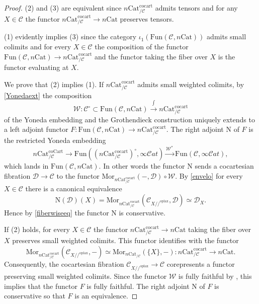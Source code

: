 \documentclass[10pt,oneside]{article}
\numberwithin{equation}{section} %
\numberwithin{figure}{section} %
\theoremstyle{plain}
\theoremstyle{definition}
\newcommand{\mC}{{\mathcal C}}
\newcommand{\mD}{{\mathcal D}}
\newcommand{\mW}{{\mathcal W}}
\newcommand{\N}{{\mathrm N}}
\newcommand{\Cat}{\mathrm{Cat}}
\newcommand{\Fun}{\mathrm{Fun}}
\newcommand{\cocart}{{\mathrm{cocart}}}
\newcommand{\oplax}{{\mathrm{oplax}}}
\newcommand{\Mor}{{\mathrm{Mor}}}
\newcommand{\coCart}{{\mathrm{coCart}}}
\newcommand{\scat}{\mathcal{C}\mathit{at}}
\begin{document}
\begin{proof}

(2) and (3) are equivalent since $n\Cat^\cocart_{/\mC}$ admits tensors and for any $X \in \mC$ the functor $ n\Cat^\cocart_{/\mC}\to n\Cat$ preserves tensors.

(1) evidently implies (3) since the category
$\iota_1(\Fun(\mC, n\Cat))$ admits small colimits and for every $X \in \mC$ the composition
of the functor $ \Fun(\mC, n\Cat) \to n\Cat^\cocart_{/\mC}$
and the functor taking the fiber over $X$ is the functor evaluating at $X.$

We prove that (2) implies (1).
If $ n\Cat^\cocart_{/\mC}$ admits small weighted colimits, by \cref{Yonedaext} the composition 
$$ \mW: \mC^\circ \subset \Fun(\mC, n\Cat) \xrightarrow{\int} n\Cat^\cocart_{/\mC} $$
of the Yoneda embedding and the Grothendieck construction
uniquely extends to a left adjoint functor 
$F: \Fun(\mC, n\Cat) \to n\Cat^\cocart_{/\mC}.$
The right adjoint $\N$ of $F$ is the restricted Yoneda embedding
$$n\Cat ^\coCart_{/\mC} \to \Fun((n\Cat^\cocart_{/\mC})^\circ, \infty\scat) \xrightarrow{\mW^*} \Fun(\mC, \infty\scat), $$
which lands in $ \Fun(\mC, n\Cat).$
In other words the functor $\N$ sends a cocartesian fibration $\mD \to \mC $ to the functor $ \Mor_{n\Cat^\cocart_{/\mC}}(-,\mD) \circ \mW $. By \cref{envelo} for every $X \in \mC$ there is a canonical equivalence
$$\N(\mD)(X)= \Mor_{n\Cat^\cocart_{/\mC}}(\mC_{X//^\oplax},\mD) \simeq \mD_{X}. $$
Hence by \cref{fiberwiseeq} the functor $\N$ is conservative.

If (2) holds, for every $X \in \mC$ the functor
$n\Cat^\cocart_{/\mC} \to n\Cat$ taking the fiber over $X$ preserves small weighted colimits.
This functor identifies with the functor
\[
\Mor_{n\Cat^\cocart_{/\mC}}(\mC_{X//^\oplax},-) \simeq \Mor_{n\Cat_{/\mC}}(\{X\},-) : n\Cat^\cocart_{/\mC} \to n\Cat.
\]
Consequently, the cocartesian fibration $ \mC_{X//^\oplax} \to \mC$
corepresents a functor preserving small weighted colimits.
Since the functor $\mW$ is fully faithful by \cite[Corollary 4.54. (2)]{heine2024bienriched}, this implies that the functor $F$ is fully faithful.
The right adjoint $\N$ of $F$ is conservative so that $F$ is an equivalence.


\end{proof}
\end{document}
